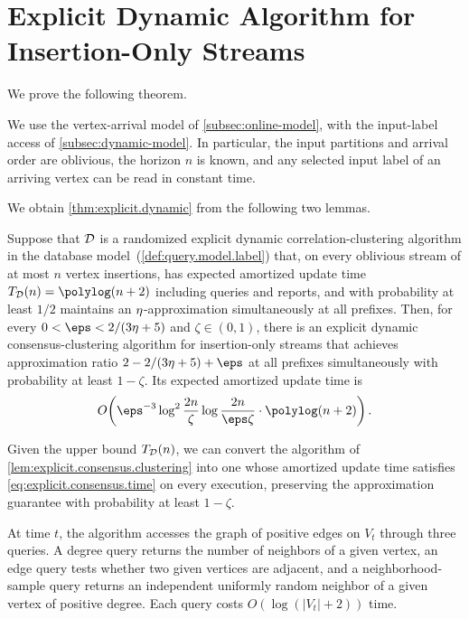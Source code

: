 

\section{Explicit Dynamic Algorithm for Insertion-Only Streams}\label{sec:explicit_dynamic_algorithm_for_insertion_only_stream}

We prove the following theorem.
\ExplicitDynamic*

We use the vertex-arrival model of \cref{subsec:online-model}, with the input-label access of \cref{subsec:dynamic-model}.
In particular, the input partitions and arrival order are oblivious, the horizon $ n $ is known, and any selected input label of an arriving vertex can be read in constant time.

We obtain \cref{thm:explicit.dynamic} from the following two lemmas.

\begin{lemma}\label{lem:explicit.consensus.clustering}
Suppose that $ \mathcal D $ is a randomized explicit dynamic correlation-clustering algorithm in the database model~(\cref{def:query.model.label}) that, on every oblivious stream of at most $ n $ vertex insertions, has expected amortized update time $ \edTime{n}=\polylog(n+2) $ including queries and reports, and with probability at least $ 1/2 $ maintains an $ \eta $-approximation simultaneously at all prefixes.
Then, for every $ 0<\eps<2/(3\edFactor+5) $ and $ \zeta\in(0,1) $, there is an explicit dynamic consensus-clustering algorithm for insertion-only streams that achieves approximation ratio $ 2-2/(3\edFactor+5)+\eps $ at all prefixes simultaneously with probability at least $ 1-\zeta $.
Its expected amortized update time is
\begin{align}
    O\!\left(
        \eps^{-3}\log^2\frac{2n}{\zeta}
        \log\frac{2n}{\eps\zeta}\cdot\polylog(n+2)
    \right).
    \label{eq:explicit.consensus.time}
\end{align}
\end{lemma}

\begin{remark}
Given the upper bound $ T_{\mathcal D}(n) $, we can convert the algorithm of \cref{lem:explicit.consensus.clustering} into one whose amortized update time satisfies \eqref{eq:explicit.consensus.time} on every execution, preserving the approximation guarantee with probability at least $ 1-\zeta $.
\end{remark}

\begin{definition}\label{def:query.model.label}
At time $ t $, the algorithm accesses the graph of positive edges on $ V_t $ through three queries.
A degree query returns the number of neighbors of a given vertex, an edge query tests whether two given vertices are adjacent, and a neighborhood-sample query returns an independent uniformly random neighbor of a given vertex of positive degree.
Each query costs $ O(\log(|V_t|+2)) $ time.
\end{definition}

